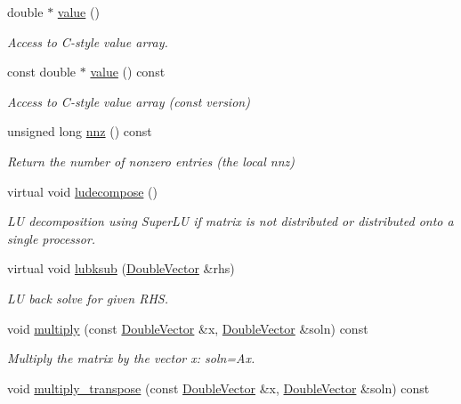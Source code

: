 \begin{DoxyCompactItemize}
double $\ast$ \hyperlink{classoomph_1_1CRDoubleMatrix_ab8220b7c2bb763dab32a4d0fea7da6f4}{value} ()
\begin{DoxyCompactList}\small\item\em Access to C-\/style value array. \end{DoxyCompactList}\item 
const double $\ast$ \hyperlink{classoomph_1_1CRDoubleMatrix_a2b0895f75ec750c386f0dbc11bfbf57b}{value} () const
\begin{DoxyCompactList}\small\item\em Access to C-\/style value array (const version) \end{DoxyCompactList}\item 
unsigned long \hyperlink{classoomph_1_1CRDoubleMatrix_a9482dafc0a17ebc5b7431369d8d07565}{nnz} () const
\begin{DoxyCompactList}\small\item\em Return the number of nonzero entries (the local nnz) \end{DoxyCompactList}\item 
virtual void \hyperlink{classoomph_1_1CRDoubleMatrix_a4b90203edbcbfec4e5e1c79f7d8d2722}{ludecompose} ()
\begin{DoxyCompactList}\small\item\em LU decomposition using Super\+LU if matrix is not distributed or distributed onto a single processor. \end{DoxyCompactList}\item 
virtual void \hyperlink{classoomph_1_1CRDoubleMatrix_af2c0f286f77ca44453f0da684b8f9dc7}{lubksub} (\hyperlink{classoomph_1_1DoubleVector}{Double\+Vector} \&rhs)
\begin{DoxyCompactList}\small\item\em LU back solve for given R\+HS. \end{DoxyCompactList}\item 
void \hyperlink{classoomph_1_1CRDoubleMatrix_a54b75960df52e3aebd21aaab20e9869d}{multiply} (const \hyperlink{classoomph_1_1DoubleVector}{Double\+Vector} \&x, \hyperlink{classoomph_1_1DoubleVector}{Double\+Vector} \&soln) const
\begin{DoxyCompactList}\small\item\em Multiply the matrix by the vector x\+: soln=Ax. \end{DoxyCompactList}\item 
void \hyperlink{classoomph_1_1CRDoubleMatrix_a42fb274c98ccf4c2a542ca15343fcc0e}{multiply\+\_\+transpose} (const \hyperlink{classoomph_1_1DoubleVector}{Double\+Vector} \&x, \hyperlink{classoomph_1_1DoubleVector}{Double\+Vector} \&soln) const

\end{DoxyCompactItemize}
